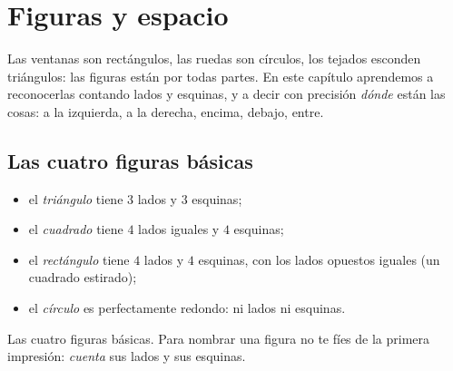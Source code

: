 \chapter{Figuras y espacio}\label{ch:g1:shapes}

Las ventanas son rectángulos, las ruedas son círculos, los tejados esconden
triángulos: las figuras están por todas partes. En este capítulo aprendemos a
reconocerlas contando lados y esquinas, y a decir con precisión \emph{dónde}
están las cosas: a la izquierda, a la derecha, encima, debajo, entre.

\section{Las cuatro figuras básicas}

\begin{definition}\label{def:g1:shapes:def}
\begin{itemize}
  \item el \emph{triángulo} tiene $3$ lados y $3$ esquinas;
  \item el \emph{cuadrado} tiene $4$ lados iguales y $4$ esquinas;
  \item el \emph{rectángulo} tiene $4$ lados y $4$ esquinas, con
        los lados opuestos iguales (un cuadrado estirado);
  \item el \emph{círculo} es perfectamente redondo: ni lados ni esquinas.
\end{itemize}
\end{definition}

\begin{omfigure}

{\small Las cuatro figuras básicas. Para nombrar una figura no te fíes de la
primera impresión: \emph{cuenta} sus lados y sus esquinas.}
\end{omfigure}

